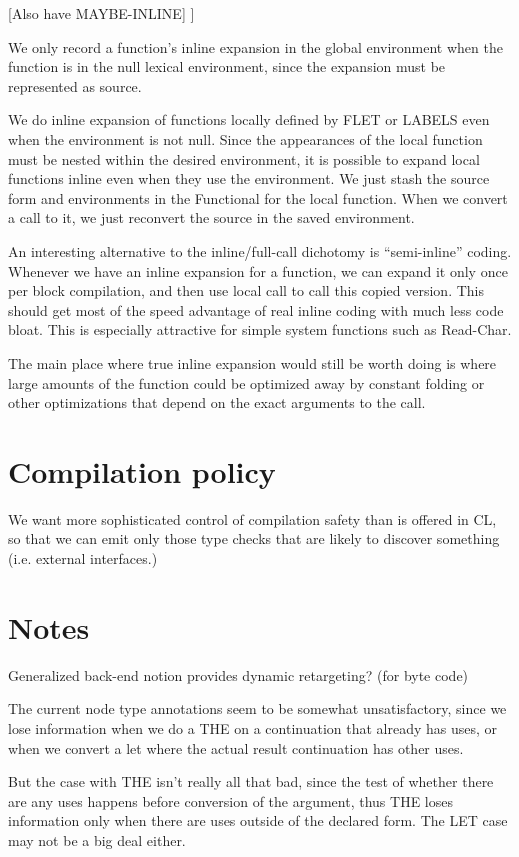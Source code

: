[Also have MAYBE-INLINE]
]

We only record a function's inline expansion in the global environment when the
function is in the null lexical environment, since the expansion must be
represented as source.

We do inline expansion of functions locally defined by FLET or LABELS even when
the environment is not null.  Since the appearances of the local function must
be nested within the desired environment, it is possible to expand local
functions inline even when they use the environment.  We just stash the source
form and environments in the Functional for the local function.  When we
convert a call to it, we just reconvert the source in the saved environment.

An interesting alternative to the inline/full-call dichotomy is ``semi-inline''
coding.  Whenever we have an inline expansion for a function, we can expand it
only once per block compilation, and then use local call to call this copied
version.  This should get most of the speed advantage of real inline coding
with much less code bloat.  This is especially attractive for simple system
functions such as Read-Char.

The main place where true inline expansion would still be worth doing is where
large amounts of the function could be optimized away by constant folding or
other optimizations that depend on the exact arguments to the call.


\section{Compilation policy}

We want more sophisticated control of compilation safety than is offered in CL,
so that we can emit only those type checks that are likely to discover
something (i.e. external interfaces.)


\section{Notes}

Generalized back-end notion provides dynamic retargeting?  (for byte code)

The current node type annotations seem to be somewhat unsatisfactory, since we
lose information when we do a THE on a continuation that already has uses, or
when we convert a let where the actual result continuation has other uses.  

But the case with THE isn't really all that bad, since the test of whether
there are any uses happens before conversion of the argument, thus THE loses
information only when there are uses outside of the declared form.  The LET
case may not be a big deal either.

